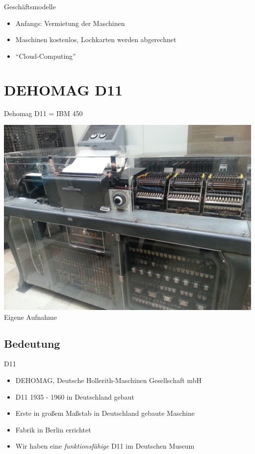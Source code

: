 \documentclass[EU2]{beamer}
\begin{document}
\begin{frame}{Geschäftsmodelle}
  \begin{itemize}
    \item Anfangs: Vermietung der Maschinen
    \item Maschinen kostenlos, Lochkarten werden abgerechnet
    \item \enquote{Cloud-Computing}
  \end{itemize}
\end{frame}

\section{DEHOMAG D11}

\begin{frame}[plain]{Dehomag D11 = IBM 450}
  \begin{center}
    \includegraphics[height=0.95\textheight]{d11}\\
    \tiny{Eigene Aufnahme}
  \end{center}
\end{frame}

\subsection{Bedeutung}

\begin{frame}{D11}
  \begin{itemize}
    \item DEHOMAG, Deutsche Hollerith-Maschinen Gesellschaft mbH
    \item D11 1935 - 1960 in Deutschland gebaut
    \item Erste in großem Maßstab in Deutschland gebaute Maschine
    \item Fabrik in Berlin errichtet
    \item Wir haben eine \emph{funktionsfähige} D11 im Deutschen Museum
  \end{itemize}
\end{frame}
\end{document}
